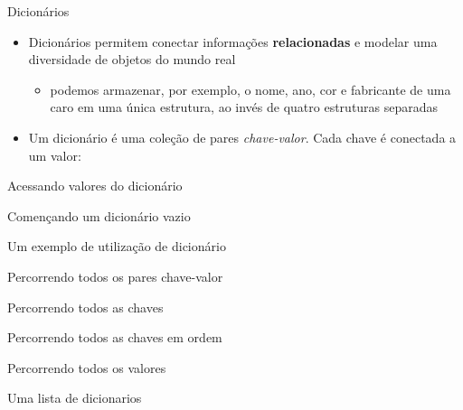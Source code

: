 \begin{frame}[t, fragile]{Dicionários}
  \begin{itemize}
      \item Dicionários permitem conectar informações {\bf relacionadas} e modelar uma diversidade de objetos do mundo real
      \begin{itemize}
      \item podemos armazenar, por exemplo, o nome, ano, cor e fabricante de uma caro em uma única estrutura, ao invés de quatro estruturas separadas
     \end{itemize}
     \item Um dicionário é uma coleção de pares {\it chave-valor}. Cada chave é conectada a um valor:
     
  \end{itemize}  
\end{frame}
%
\begin{frame}[t, fragile]{Acessando valores do dicionário}
  
\end{frame}
%
\begin{frame}[t, fragile]{Començando um dicionário vazio}
  
\end{frame}
%
\begin{frame}[t, fragile]{Um exemplo de utilização de dicionário}
  
\end{frame}
%
\begin{frame}[t, fragile]{Percorrendo todos os pares chave-valor}
  
\end{frame}
%
\begin{frame}[t, fragile]{Percorrendo todos as chaves}
  
\end{frame}
%
\begin{frame}[t, fragile]{Percorrendo todos as chaves em ordem}
  
\end{frame}
%
\begin{frame}[t, fragile]{Percorrendo todos os valores}
  
\end{frame}
%
\begin{frame}[t, fragile]{Uma lista de dicionarios}
  
\end{frame}
%


 